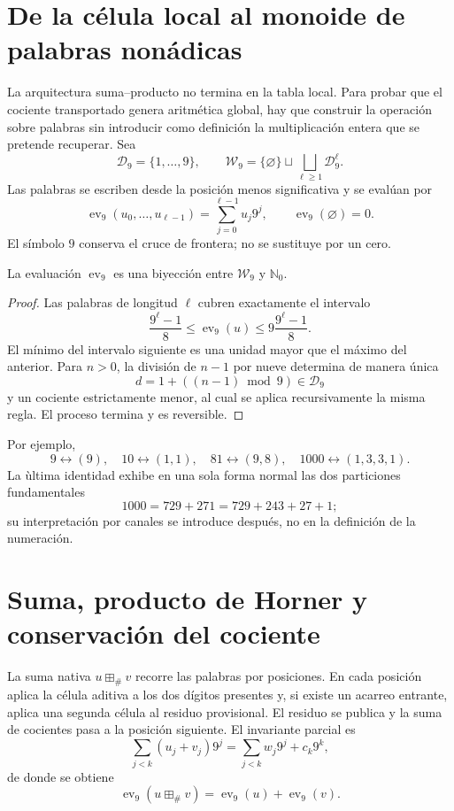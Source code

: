 \ifdefined\HMTTPKWordArithmetic
\section{De la célula local al monoide de palabras nonádicas}

La arquitectura suma--producto no termina en la tabla local. Para probar que
el cociente transportado genera aritm\'etica global, hay que construir la
operaci\'on sobre palabras sin introducir como definici\'on la multiplicaci\'on
entera que se pretende recuperar. Sea
\[
 \mathcal D_9=\{1,\ldots,9\},\qquad
 \mathcal W_9=\{\varnothing\}\sqcup
 \bigsqcup_{\ell\geq1}\mathcal D_9^\ell .
\]
Las palabras se escriben desde la posici\'on menos significativa y se eval\'uan
por
\[
 \operatorname{ev}_9(u_0,\ldots,u_{\ell-1})
 =\sum_{j=0}^{\ell-1}u_j9^j,\qquad
 \operatorname{ev}_9(\varnothing)=0.
\]
El s\'imbolo \(9\) conserva el cruce de frontera; no se sustituye por un cero.

\begin{theorem}
La evaluaci\'on \(\operatorname{ev}_9\) es una biyecci\'on entre
\(\mathcal W_9\) y \(\mathbb N_0\).
\end{theorem}
\begin{proof}
Las palabras de longitud \(\ell\) cubren exactamente el intervalo
\[
 \frac{9^\ell-1}{8}
 \leq\operatorname{ev}_9(u)
 \leq9\frac{9^\ell-1}{8}.
\]
El m\'inimo del intervalo siguiente es una unidad mayor que el m\'aximo del
anterior. Para \(n>0\), la divisi\'on de \(n-1\) por nueve determina de manera
\'unica
\[
 d=1+((n-1)\bmod9)\in\mathcal D_9
\]
y un cociente estrictamente menor, al cual se aplica recursivamente la misma
regla. El proceso termina y es reversible.
\end{proof}
Por ejemplo,
\[
 9\leftrightarrow(9),\quad
 10\leftrightarrow(1,1),\quad
 81\leftrightarrow(9,8),\quad
 1000\leftrightarrow(1,3,3,1).
\]
La \`ultima identidad exhibe en una sola forma normal las dos particiones
fundamentales
\[
 1000=729+271=729+243+27+1;
\]
su interpretaci\'on por canales se introduce despu\'es, no en la definici\'on
de la numeraci\'on.

\section{Suma, producto de Horner y conservación del cociente}

La suma nativa \(u\boxplus_\#v\) recorre las palabras por posiciones. En cada
posici\'on aplica la c\'elula aditiva a los dos d\'igitos presentes y, si existe
un acarreo entrante, aplica una segunda c\'elula al residuo provisional. El
residuo se publica y la suma de cocientes pasa a la posici\'on siguiente. El
invariante parcial es
\[
 \sum_{j<k}(u_j+v_j)9^j
 =\sum_{j<k}w_j9^j+c_k9^k,
\]
de donde se obtiene
\[
 \operatorname{ev}_9(u\boxplus_\#v)
 =\operatorname{ev}_9(u)+\operatorname{ev}_9(v).
\]

